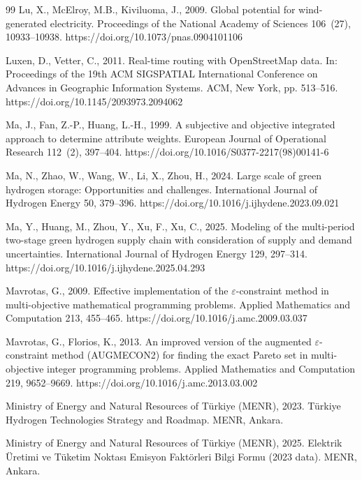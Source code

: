 \documentclass[preprint,12pt,authoryear]{elsarticle}
\begin{document}
\begin{thebibliography}{99}
Lu, X., McElroy, M.B., Kiviluoma, J., 2009. Global potential for wind-generated electricity. Proceedings of the National Academy of Sciences 106~(27), 10933--10938. https://doi.org/10.1073/pnas.0904101106

Luxen, D., Vetter, C., 2011. Real-time routing with OpenStreetMap data. In: Proceedings of the 19th ACM SIGSPATIAL International Conference on Advances in Geographic Information Systems. ACM, New York, pp. 513--516. https://doi.org/10.1145/2093973.2094062

Ma, J., Fan, Z.-P., Huang, L.-H., 1999. A subjective and objective integrated approach to determine attribute weights. European Journal of Operational Research 112~(2), 397--404. https://doi.org/10.1016/S0377-2217(98)00141-6

Ma, N., Zhao, W., Wang, W., Li, X., Zhou, H., 2024. Large scale of green hydrogen storage: Opportunities and challenges. International Journal of Hydrogen Energy 50, 379--396. https://doi.org/10.1016/j.ijhydene.2023.09.021

Ma, Y., Huang, M., Zhou, Y., Xu, F., Xu, C., 2025. Modeling of the multi-period two-stage green hydrogen supply chain with consideration of supply and demand uncertainties. International Journal of Hydrogen Energy 129, 297--314. https://doi.org/10.1016/j.ijhydene.2025.04.293

Mavrotas, G., 2009. Effective implementation of the $\varepsilon$-constraint method in multi-objective mathematical programming problems. Applied Mathematics and Computation 213, 455--465. https://doi.org/10.1016/j.amc.2009.03.037

Mavrotas, G., Florios, K., 2013. An improved version of the augmented $\varepsilon$-constraint method (AUGMECON2) for finding the exact Pareto set in multi-objective integer programming problems. Applied Mathematics and Computation 219, 9652--9669. https://doi.org/10.1016/j.amc.2013.03.002

Ministry of Energy and Natural Resources of Türkiye (MENR), 2023. Türkiye Hydrogen Technologies Strategy and Roadmap. MENR, Ankara.

Ministry of Energy and Natural Resources of T{\"u}rkiye (MENR), 2025. Elektrik {\"U}retimi ve T{\"u}ketim Noktas{\i} Emisyon Fakt{\"o}rleri Bilgi Formu (2023 data). MENR, Ankara.


\end{thebibliography}
\end{document}
